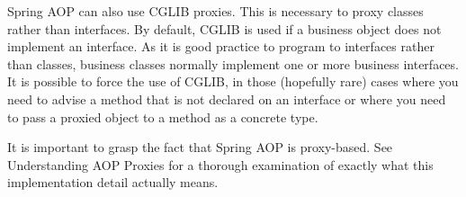 Spring AOP can also use CGLIB proxies. This is necessary to proxy classes rather than interfaces. By
default, CGLIB is used if a business object does not implement an interface. As it is good practice to
program to interfaces rather than classes, business classes normally implement one or more
business interfaces. It is possible to force the use of CGLIB, in those (hopefully rare) cases where
you need to advise a method that is not declared on an interface or where you need to pass a
proxied object to a method as a concrete type.

It is important to grasp the fact that Spring AOP is proxy-based. See Understanding AOP Proxies for
a thorough examination of exactly what this implementation detail actually means.